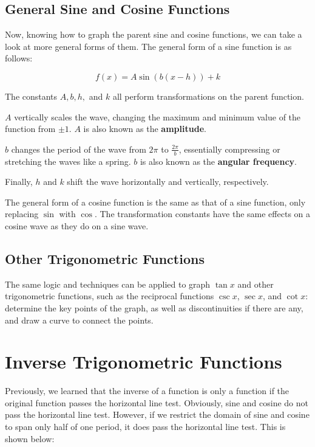 \documentclass[11pt]{article}
\begin{document}
\subsection{General Sine and Cosine Functions}

Now, knowing how to graph the parent sine and cosine functions, we can take a look at more general forms of them. The general form of a sine function is as follows:

\[ f(x) = A\sin(b(x-h))+k \]

The constants $A, b, h,$ and $k$ all perform transformations on the parent function. 

$A$ vertically scales the wave, changing the maximum and minimum value of the function from $\pm 1$. $A$ is also known as the \textbf{amplitude}. 

$b$ changes the period of the wave from $2\pi$ to $\frac{2\pi}{b}$, essentially compressing or stretching the waves like a spring. $b$ is also known as the \textbf{angular frequency}.

Finally, $h$ and $k$ shift the wave horizontally and vertically, respectively.

The general form of a cosine function is the same as that of a sine function, only replacing $\sin$ with $\cos$. The transformation constants have the same effects on a cosine wave as they do on a sine wave.

\subsection{Other Trigonometric Functions}

The same logic and techniques can be applied to graph $\tan x$ and other trigonometric functions, such as the reciprocal functions $\csc x$, $\sec x$, and $\cot x$: determine the key points of the graph, as well as discontinuities if there are any, and draw a curve to connect the points. 

\section{Inverse Trigonometric Functions}

Previously, we learned that the inverse of a function is only a function if the original function passes the horizontal line test. Obviously, sine and cosine do not pass the horizontal line test. However, if we restrict the domain of sine and cosine to span only half of one period, it does pass the horizontal line test. This is shown below:
\end{document}
